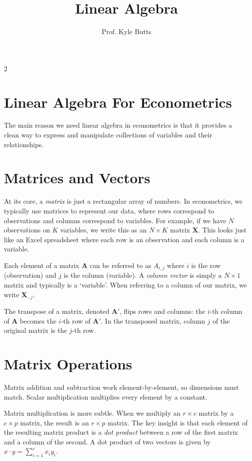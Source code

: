 \documentclass[12pt]{article}
\title{Linear Algebra}
\author{Prof. Kyle Butts}
\date{}
\begin{document}
\maketitle
\begin{multicols}{2}
	\section*{Linear Algebra For Econometrics}

	The main reason we need linear algebra in econometrics is that it provides a clean way to express and manipulate collections of variables and their relationships.

	\section*{Matrices and Vectors}

	At its core, a \emph{matrix} is just a rectangular array of numbers. 
  In econometrics, we typically use matrices to represent our data, where rows correspond to observations and columns correspond to variables. 
  For example, if we have $N$ observations on $K$ variables, we write this as an $N \times K$ matrix $\bm{X}$. 
  This looks just like an Excel spreadsheet where each row is an observation and each column is a variable.

	Each element of a matrix $\bm{A}$ can be referred to as $A_{i,j}$ where $i$ is the row (observation) and $j$ is the column (variable). 
  A \emph{column vector} is simply a $N \times 1$ matrix and typically is a `variable'.
  When referring to a column of our matrix, we write $\bm{X}_{\cdot, j}$.

	The transpose of a matrix, denoted $\bm{A}'$, flips rows and columns: the $i$-th column of $\bm{A}$ becomes the $i$-th row of $\bm{A}'$.
  In the transposed matrix, column $j$ of the original matrix is the $j$-th row. 

	\section*{Matrix Operations}

	Matrix addition and subtraction work element-by-element, so dimensions must match. 
  Scalar multiplication multiplies every element by a constant.

	Matrix multiplication is more subtle. 
  When we multiply an $r \times c$ matrix by a $c \times p$ matrix, the result is an $r \times p$ matrix. 
  The key insight is that each element of the resulting matrix product is a \emph{dot product} between a row of the first matrix and a column of the second.
  A dot product of two vectors is given by $x \cdot y = \sum_{i=1}^c x_i y_i$.


\end{multicols}
\end{document}
